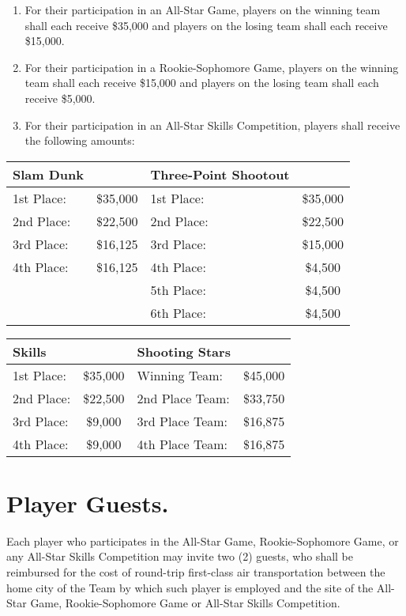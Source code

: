 \documentclass[
]{book}
\providecommand{\tightlist}{%
  \setlength{\itemsep}{0pt}\setlength{\parskip}{0pt}}
\begin{document}
\begin{enumerate}
\def\labelenumi{(\alph{enumi})}
\tightlist
\item
  For their participation in an All-Star Game, players on the winning team shall each receive \$35,000 and players on the losing team shall each receive \$15,000.
\item
  For their participation in a Rookie-Sophomore Game, players on the winning team shall each receive \$15,000 and players on the losing team shall each receive \$5,000.
\item
  For their participation in an All-Star Skills Competition, players shall receive the following amounts:
\end{enumerate}

\begin{longtable}[]{@{}lclc@{}}
\toprule()
Slam Dunk & & Three-Point Shootout & \\
\midrule()
\endhead
1st Place: & \$35,000 & 1st Place: & \$35,000 \\
2nd Place: & \$22,500 & 2nd Place: & \$22,500 \\
3rd Place: & \$16,125 & 3rd Place: & \$15,000 \\
4th Place: & \$16,125 & 4th Place: & \$4,500 \\
& & 5th Place: & \$4,500 \\
& & 6th Place: & \$4,500 \\
\bottomrule()
\end{longtable}

\begin{longtable}[]{@{}lclc@{}}
\toprule()
Skills & & Shooting Stars & \\
\midrule()
\endhead
1st Place: & \$35,000 & Winning Team: & \$45,000 \\
2nd Place: & \$22,500 & 2nd Place Team: & \$33,750 \\
3rd Place: & \$9,000 & 3rd Place Team: & \$16,875 \\
4th Place: & \$9,000 & 4th Place Team: & \$16,875 \\
\bottomrule()
\end{longtable}

\hypertarget{player-guests.}{%
\section{Player Guests.}\label{player-guests.}}

Each player who participates in the All-Star Game, Rookie-Sophomore Game, or any All-Star Skills Competition may invite two (2) guests, who shall be reimbursed for the cost of round-trip first-class air transportation between the home city of the Team by which such player is employed and the site of the All-Star Game, Rookie-Sophomore Game or All-Star Skills Competition.
\end{document}
